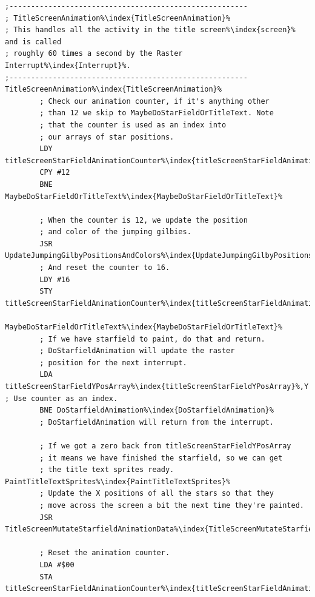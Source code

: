 \begin{lstlisting}[caption=\icode{TitleScreenAnimation\index{TitleScreenAnimation}} responsible for choosing what to do at each interrupt\index{interrupt}. ,escapechar=\%]
;-------------------------------------------------------
; TitleScreenAnimation%\index{TitleScreenAnimation}%
; This handles all the activity in the title screen%\index{screen}% and is called
; roughly 60 times a second by the Raster Interrupt%\index{Interrupt}%.
;-------------------------------------------------------
TitleScreenAnimation%\index{TitleScreenAnimation}%
        ; Check our animation counter, if it's anything other
        ; than 12 we skip to MaybeDoStarFieldOrTitleText. Note
        ; that the counter is used as an index into 
        ; our arrays of star positions.
        LDY titleScreenStarFieldAnimationCounter%\index{titleScreenStarFieldAnimationCounter}%
        CPY #12
        BNE MaybeDoStarFieldOrTitleText%\index{MaybeDoStarFieldOrTitleText}%

        ; When the counter is 12, we update the position
        ; and color of the jumping gilbies.
        JSR UpdateJumpingGilbyPositionsAndColors%\index{UpdateJumpingGilbyPositionsAndColors}%
        ; And reset the counter to 16. 
        LDY #16
        STY titleScreenStarFieldAnimationCounter%\index{titleScreenStarFieldAnimationCounter}%

MaybeDoStarFieldOrTitleText%\index{MaybeDoStarFieldOrTitleText}%   
        ; If we have starfield to paint, do that and return.
        ; DoStarfieldAnimation will update the raster
        ; position for the next interrupt.
        LDA titleScreenStarFieldYPosArray%\index{titleScreenStarFieldYPosArray}%,Y ; Use counter as an index.
        BNE DoStarfieldAnimation%\index{DoStarfieldAnimation}%
        ; DoStarfieldAnimation will return from the interrupt.

        ; If we got a zero back from titleScreenStarFieldYPosArray
        ; it means we have finished the starfield, so we can get
        ; the title text sprites ready.
PaintTitleTextSprites%\index{PaintTitleTextSprites}%
        ; Update the X positions of all the stars so that they
        ; move across the screen a bit the next time they're painted.
        JSR TitleScreenMutateStarfieldAnimationData%\index{TitleScreenMutateStarfieldAnimationData}%

        ; Reset the animation counter.
        LDA #$00
        STA titleScreenStarFieldAnimationCounter%\index{titleScreenStarFieldAnimationCounter}%


\end{lstlisting}
